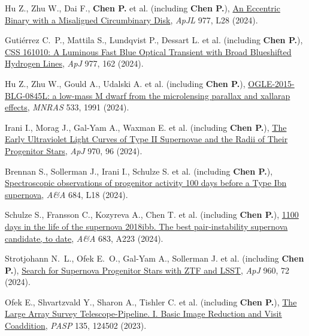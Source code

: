 \item Hu Z., Zhu W., Dai F., \textbf{Chen P.} et al. (including \textbf{Chen P.}), \href{https://ui.adsabs.harvard.edu/abs/2024ApJ...977L..28H}{An Eccentric Binary with a Misaligned Circumbinary Disk}, \textit{ApJL} 977, L28 (2024).

\item Guti{\'e}rrez C.~P., Mattila S., Lundqvist P., Dessart L. et al. (including \textbf{Chen P.}), \href{https://ui.adsabs.harvard.edu/abs/2024ApJ...977..162G}{CSS 161010: A Luminous Fast Blue Optical Transient with Broad Blueshifted Hydrogen Lines}, \textit{ApJ} 977, 162 (2024).

\item Hu Z., Zhu W., Gould A., Udalski A. et al. (including \textbf{Chen P.}), \href{https://ui.adsabs.harvard.edu/abs/2024MNRAS.533.1991H}{OGLE-2015-BLG-0845L: a low-mass M dwarf from the microlensing parallax and xallarap effects}, \textit{MNRAS} 533, 1991 (2024).

\item Irani I., Morag J., Gal-Yam A., Waxman E. et al. (including \textbf{Chen P.}), \href{https://ui.adsabs.harvard.edu/abs/2024ApJ...970...96I}{The Early Ultraviolet Light Curves of Type II Supernovae and the Radii of Their Progenitor Stars}, \textit{ApJ} 970, 96 (2024).

\item Brennan S., Sollerman J., Irani I., Schulze S. et al. (including \textbf{Chen P.}), \href{https://ui.adsabs.harvard.edu/abs/2024A&A...684L..18B}{Spectroscopic observations of progenitor activity 100 days before a Type Ibn supernova}, \textit{A\&A} 684, L18 (2024).

\item Schulze S., Fransson C., Kozyreva A., Chen T. et al. (including \textbf{Chen P.}), \href{https://ui.adsabs.harvard.edu/abs/2024A&A...683A.223S}{1100 days in the life of the supernova 2018ibb. The best pair-instability supernova candidate, to date}, \textit{A\&A} 683, A223 (2024).

\item Strotjohann N.~L., Ofek E.~O., Gal-Yam A., Sollerman J. et al. (including \textbf{Chen P.}), \href{https://ui.adsabs.harvard.edu/abs/2024ApJ...960...72S}{Search for Supernova Progenitor Stars with ZTF and LSST}, \textit{ApJ} 960, 72 (2024).

\item Ofek E., Shvartzvald Y., Sharon A., Tishler C. et al. (including \textbf{Chen P.}), \href{https://ui.adsabs.harvard.edu/abs/2023PASP..135l4502O}{The Large Array Survey Telescope-Pipeline. I. Basic Image Reduction and Visit Coaddition}, \textit{PASP} 135, 124502 (2023).

